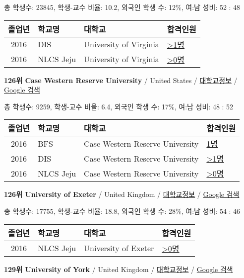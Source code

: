 \documentclass[13pt,]{article}
\begin{document}
총 학생수: 23845, 학생-교수 비율: 10.2, 외국인 학생 수: 12\%, 여:남
성비: 52 : 48

\begin{longtable}[]{@{}clll@{}}
\toprule
졸업년 & 학교명 & 대학교 & 합격인원\tabularnewline
\midrule
\endhead
2016 & DIS & University of Virginia &
\href{http://cafe.naver.com/assarabia/11591}{\textgreater{}1명}\tabularnewline
2016 & NLCS Jeju & University of Virginia &
\href{http://cafe.naver.com/assarabia/11592}{\textgreater{}0명}\tabularnewline
\bottomrule
\end{longtable}

\textbf{126위 Case Western Reserve University} / United States /
\href{https://www.timeshighereducation.com/world-university-rankings/case-western-reserve-university?ranking-dataset=589595}{대학교정보}
/
\href{http://www.google.com/search?q=Case+Western+Reserve+University}{Google
검색}

총 학생수: 9259, 학생-교수 비율: 6.4, 외국인 학생 수: 17\%, 여:남 성비:
48 : 52

\begin{longtable}[]{@{}clll@{}}
\toprule
졸업년 & 학교명 & 대학교 & 합격인원\tabularnewline
\midrule
\endhead
2016 & BFS & Case Western Reserve University &
\href{http://cafe.naver.com/assarabia/11597}{1명}\tabularnewline
2016 & DIS & Case Western Reserve University &
\href{http://cafe.naver.com/assarabia/11591}{\textgreater{}1명}\tabularnewline
2016 & NLCS Jeju & Case Western Reserve University &
\href{http://cafe.naver.com/assarabia/11592}{\textgreater{}0명}\tabularnewline
\bottomrule
\end{longtable}

\textbf{126위 University of Exeter} / United Kingdom /
\href{https://www.timeshighereducation.com/world-university-rankings/university-of-exeter?ranking-dataset=589595}{대학교정보}
/ \href{http://www.google.com/search?q=University+of+Exeter}{Google
검색}

총 학생수: 17755, 학생-교수 비율: 18.8, 외국인 학생 수: 28\%, 여:남
성비: 54 : 46

\begin{longtable}[]{@{}clll@{}}
\toprule
졸업년 & 학교명 & 대학교 & 합격인원\tabularnewline
\midrule
\endhead
2016 & NLCS Jeju & University of Exeter &
\href{http://cafe.naver.com/assarabia/11592}{\textgreater{}0명}\tabularnewline
\bottomrule
\end{longtable}

\textbf{129위 University of York} / United Kingdom /
\href{https://www.timeshighereducation.com/world-university-rankings/university-of-york?ranking-dataset=589595}{대학교정보}
/ \href{http://www.google.com/search?q=University+of+York}{Google 검색}
\end{document}
